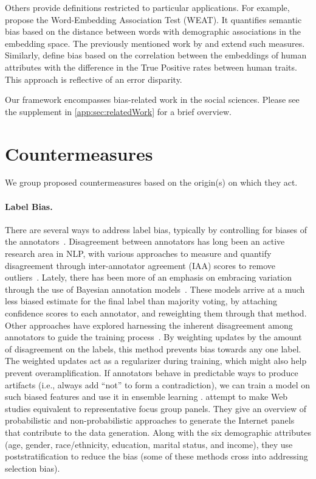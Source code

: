 \documentclass[11pt,a4paper]{article}
\begin{document}
Others provide definitions restricted to particular applications. For example,  propose the Word-Embedding Association Test (WEAT). It quantifies semantic bias based on the distance between words with demographic associations in the embedding space. The previously mentioned work by  and  extend such measures. 
Similarly,  define bias based on the correlation between the embeddings of human attributes with the difference in the True Positive rates between human traits. This approach is reflective of an error disparity. 

Our framework encompasses bias-related work in the social sciences. Please see the supplement in \ref{app:sec:relatedWork} for a brief overview.


\section{Countermeasures}
We group proposed countermeasures based on the origin(s) on which they act. 

\paragraph{Label Bias.}
There are several ways to address label bias, typically by controlling for biases of the annotators~\cite{pavlick2014language}. 
Disagreement between annotators has long been an active research area in NLP, with various approaches to measure and quantify disagreement through inter-annotator agreement (IAA) scores to remove outliers~\cite{artstein2008inter}. Lately, there has been more of an emphasis on embracing variation through the use of Bayesian annotation models~\cite{hovy2013learning,passonneau2014benefits,paun2018comparing}. These models arrive at a much less biased estimate for the final label than majority voting, by attaching confidence scores to each annotator, and reweighting them through that method.
Other approaches have explored harnessing the inherent disagreement among annotators to guide the training process~\cite{plank2014learning}. By weighting updates by the amount of disagreement on the labels, this method prevents bias towards any one label. The weighted updates act as a regularizer during training, which might also help prevent overamplification.
If annotators behave in predictable ways to produce artifacts (i.e., always add ``not'' to form a contradiction), we can train a model on such biased features and use it in ensemble learning \cite{clark2019don}.
 attempt to make Web studies equivalent to representative focus group panels. They give an overview of probabilistic and non-probabilistic approaches to generate the Internet panels that contribute to the data generation. Along with the six demographic attributes (age, gender, race/ethnicity, education, marital status, and income), they use poststratification to reduce the bias (some of these methods cross into addressing selection bias).
\end{document}
